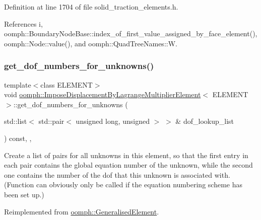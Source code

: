 Definition at line 1704 of file solid\+\_\+traction\+\_\+elements.\+h.



References i, oomph\+::\+Boundary\+Node\+Base\+::index\+\_\+of\+\_\+first\+\_\+value\+\_\+assigned\+\_\+by\+\_\+face\+\_\+element(), oomph\+::\+Node\+::value(), and oomph\+::\+Quad\+Tree\+Names\+::W.

\mbox{\label{classoomph_1_1ImposeDisplacementByLagrangeMultiplierElement_aa6fc1525ac4a93f5135a0c58bd211ffb}} 
\subsubsection{\texorpdfstring{get\+\_\+dof\+\_\+numbers\+\_\+for\+\_\+unknowns()}{get\_dof\_numbers\_for\_unknowns()}}
{\footnotesize\ttfamily template$<$class E\+L\+E\+M\+E\+NT$>$ \\
void \hyperlink{classoomph_1_1ImposeDisplacementByLagrangeMultiplierElement}{oomph\+::\+Impose\+Displacement\+By\+Lagrange\+Multiplier\+Element}$<$ E\+L\+E\+M\+E\+NT $>$\+::get\+\_\+dof\+\_\+numbers\+\_\+for\+\_\+unknowns (\begin{DoxyParamCaption}\item[{std\+::list$<$ std\+::pair$<$ unsigned long, unsigned $>$ $>$ \&}]{dof\+\_\+lookup\+\_\+list }\end{DoxyParamCaption}) const\hspace{0.3cm}{\ttfamily [inline]}, {\ttfamily [protected]}, {\ttfamily [virtual]}}



Create a list of pairs for all unknowns in this element, so that the first entry in each pair contains the global equation number of the unknown, while the second one contains the number of the dof that this unknown is associated with. (Function can obviously only be called if the equation numbering scheme has been set up.) 



Reimplemented from \hyperlink{classoomph_1_1GeneralisedElement_a069f59bfc3e607a5bebba52c6314d777}{oomph\+::\+Generalised\+Element}.



